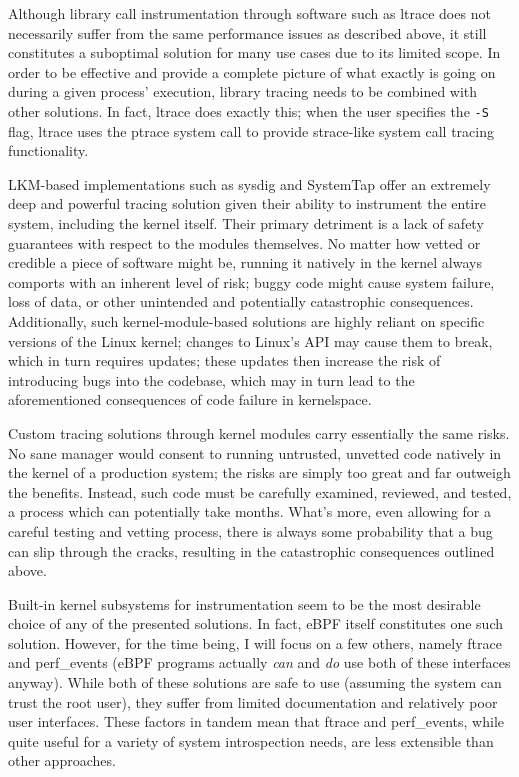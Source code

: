 \documentclass[
  12pt]{findlay}
\begin{document}
Although library call instrumentation through software such as ltrace
\autocite{rubirabranco07,manltrace} does not necessarily suffer from the
same performance issues as described above, it still constitutes a
suboptimal solution for many use cases due to its limited scope. In
order to be effective and provide a complete picture of what exactly is
going on during a given process' execution, library tracing needs to be
combined with other solutions. In fact, ltrace does exactly this; when
the user specifies the \texttt{-S} flag, ltrace uses the ptrace system
call to provide strace-like system call tracing functionality.

LKM-based implementations such as sysdig \autocite{sysdig} and SystemTap
\autocite{systemtap} offer an extremely deep and powerful tracing
solution given their ability to instrument the entire system, including
the kernel itself. Their primary detriment is a lack of safety
guarantees with respect to the modules themselves. No matter how vetted
or credible a piece of software might be, running it natively in the
kernel always comports with an inherent level of risk; buggy code might
cause system failure, loss of data, or other unintended and potentially
catastrophic consequences. Additionally, such kernel-module-based
solutions are highly reliant on specific versions of the Linux kernel;
changes to Linux's API may cause them to break, which in turn requires
updates; these updates then increase the risk of introducing bugs into
the codebase, which may in turn lead to the aforementioned consequences
of code failure in kernelspace.

Custom tracing solutions through kernel modules carry essentially the
same risks. No sane manager would consent to running untrusted, unvetted
code natively in the kernel of a production system; the risks are simply
too great and far outweigh the benefits. Instead, such code must be
carefully examined, reviewed, and tested, a process which can
potentially take months. What's more, even allowing for a careful
testing and vetting process, there is always some probability that a bug
can slip through the cracks, resulting in the catastrophic consequences
outlined above.

Built-in kernel subsystems for instrumentation seem to be the most
desirable choice of any of the presented solutions. In fact, eBPF
\autocite{starovoitov13,starovoitov14} itself constitutes one such
solution. However, for the time being, I will focus on a few others,
namely ftrace \autocite{ftrace} and perf\_events
\autocite{manperfeventopen} (eBPF programs actually \emph{can} and
\emph{do} use both of these interfaces anyway). While both of these
solutions are safe to use (assuming the system can trust the root user),
they suffer from limited documentation and relatively poor user
interfaces. These factors in tandem mean that ftrace and perf\_events,
while quite useful for a variety of system introspection needs, are less
extensible than other approaches.
\end{document}
